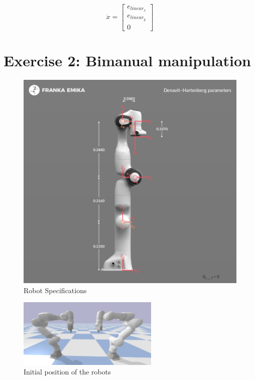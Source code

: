 \documentclass{article}
\begin{document}
$$\dot{x} = \begin{bmatrix}
		e_{linear_x} \\
            e_{linear_y} \\
            0
		\end{bmatrix} $$


\clearpage
\section{Exercise 2: Bimanual manipulation}

\begin{figure}
	\centering
	\includegraphics[width=\textwidth]{dh-diagram.png}
	\caption{\label{fig:robot_spec}Robot Specifications}
\end{figure}
\begin{figure}
	\centering
	\includegraphics[width=0.6\textwidth]{initial_position.png}
	\caption{\label{fig:1}Initial position of the robots}
\end{figure}
\end{document}

